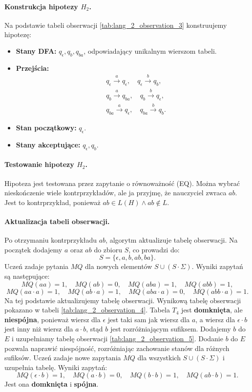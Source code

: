 \paragraph*{Konstrukcja hipotezy $H_2$.}
Na podstawie tabeli obserwacji \ref{tab:lang_2_observation_3} konstruujemy hipotezę:
\begin{itemize}
    \item \textbf{Stany DFA:} \( q_\epsilon, q_b, q_{ba} \), odpowiadający unikalnym wierszom tabeli.
    \item \textbf{Przejścia:}
    \begin{align*}
        & q_\epsilon \xrightarrow{a} q_\epsilon, \quad q_\epsilon \xrightarrow{b} q_b, \\
        & q_b \xrightarrow{a} q_{ba}, \quad q_b \xrightarrow{b} q_\epsilon, \\
        & q_{ba} \xrightarrow{a} q_\epsilon, \quad q_{ba} \xrightarrow{b} q_b.
    \end{align*}
    \item \textbf{Stan początkowy:} \( q_\epsilon \).
    \item \textbf{Stany akceptujące:} \( q_\epsilon, q_b \).
\end{itemize}

\paragraph*{Testowanie hipotezy $H_2$.}
Hipoteza jest testowana przez zapytanie o równoważność (EQ). Można wybrać nieskończenie wiele kontrprzykładów, ale ja przyjmę, że nauczyciel zwraca $ab$. Jest to kontrprzykład, ponieważ \( ab \in L(H) \land ab \notin L \). 

\paragraph*{Aktualizacja tabeli obserwacji.}
Po otrzymaniu kontrprzykładu \( ab \), algorytm aktualizuje tabelę obserwacji. Na początek dodajemy \( a \) oraz \( ab \) do zbioru \( S \), co prowadzi do:
\[
S = \{ \epsilon, a, b, ab, ba \}.
\]
Uczeń zadaje pytania \( MQ \) dla nowych elementów \( S \cup (S \cdot \Sigma) \). Wyniki zapytań są następujące:
\[
MQ(aa) = 1, \quad MQ(ab) = 0, \quad MQ(aba) = 1, \quad MQ(abb) = 1,
\]
\[
MQ(aa \cdot a) = 1, \quad MQ(ab \cdot a) = 1, \quad MQ(aba \cdot a) = 0, \quad MQ(abb \cdot a) = 1.
\]
Na tej podstawie aktualizujemy tabelę obserwacji. Wynikową tabelę obserwacji pokazano w tabeli \ref{tab:lang_2_observation_4}. Tabela \( T_4 \) jest \textbf{domknięta}, ale \textbf{niespójna}, ponieważ wiersz dla $\epsilon$ jest taki sam jak wiersz dla $a$, a wiersz dla \( \epsilon \cdot b \) jest inny niż wiersz dla \( a \cdot b \), stąd $b$ jest rozróżniającym sufiksem. Dodajemy $b$ do $E$ i uzupełniamy tabelę obserwacji \ref{tab:lang_2_observation_5}. 
Dodanie \( b \) do \( E \) pozwala naprawić niespójność, rozróżniając zachowanie stanów dla różnych sufiksów. Uczeń zadaje nowe zapytania \( MQ \) dla wszystkich \( S \cup (S \cdot \Sigma) \) i uzupełnia tabelę. Wyniki zapytań:
\[
MQ(\epsilon \cdot b) = 1, \quad MQ(a \cdot b) = 0, \quad MQ(b \cdot b) = 1, \quad MQ(ab \cdot b) = 1.
\]
Jest ona \textbf{domknięta} i \textbf{spójna}. 

